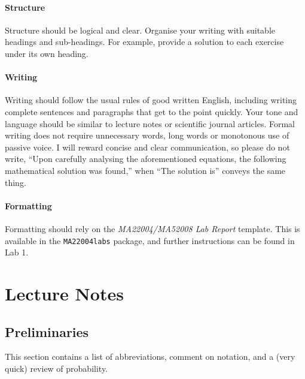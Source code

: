 \documentclass[
  a4paper,
  DIV=11,
  numbers=noendperiod,
  oneside]{scrreprt}
\theoremstyle{definition}
\theoremstyle{definition}
\theoremstyle{plain}
\theoremstyle{plain}
\theoremstyle{definition}
\theoremstyle{remark}
\begin{document}
\subsection*{Structure}\label{w-structure}

Structure should be logical and clear. Organise your writing with
suitable headings and sub-headings. For example, provide a solution to
each exercise under its own heading.

\subsection*{Writing}\label{w-eng}

Writing should follow the usual rules of good written English, including
writing complete sentences and paragraphs that get to the point quickly.
Your tone and language should be similar to lecture notes or scientific
journal articles. Formal writing does not require unnecessary words,
long words or monotonous use of passive voice. I will reward concise and
clear communication, so please do not write, ``Upon carefully analysing
the aforementioned equations, the following mathematical solution was
found,'' when ``The solution is'' conveys the same thing.

\subsection*{Formatting}\label{w-format}

Formatting should rely on the \emph{MA22004/MA52008 Lab Report}
template. This is available in the \texttt{MA22004labs} package, and
further instructions can be found in Lab 1.

\part{Lecture Notes}

\chapter*{Preliminaries}\label{preliminaries}


This section contains a list of abbreviations, comment on notation, and
a (very quick) review of probability.
\end{document}
